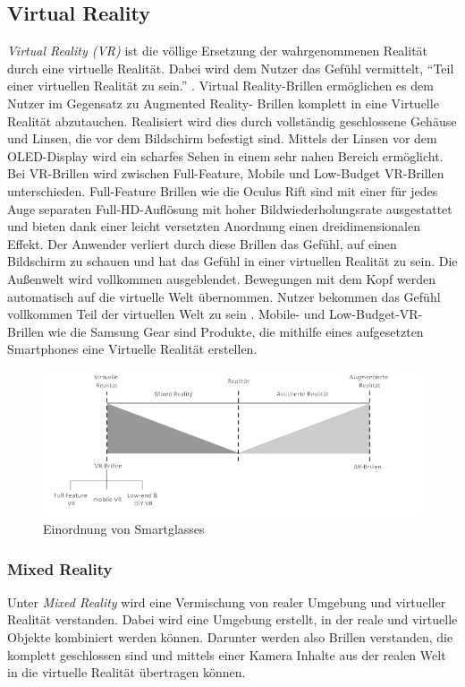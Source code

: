 \subsection{Virtual Reality}
%
\emph{Virtual Reality (VR)} ist die völlige Ersetzung der wahrgenommenen Realität durch eine virtuelle Realität. Dabei wird dem Nutzer das Gefühl vermittelt, \enquote{Teil einer virtuellen Realität zu sein.} \cite[S.~22]{ThomasDirkMetzgerHelmutNiegemannHrsg2018}. Virtual Reality-Brillen ermöglichen es dem Nutzer im Gegensatz zu Augmented Reality- Brillen komplett in eine Virtuelle Realität abzutauchen. Realisiert wird dies durch vollständig geschlossene Gehäuse und Linsen, die vor dem Bildschirm befestigt sind. Mittels der Linsen vor dem OLED-Display wird ein scharfes Sehen in einem sehr nahen Bereich ermöglicht. Bei VR-Brillen wird zwischen Full-Feature, Mobile und Low-Budget VR-Brillen unterschieden. Full-Feature Brillen wie die Oculus Rift sind mit einer für jedes Auge separaten Full-HD-Auflösung mit hoher Bildwiederholungsrate ausgestattet und bieten dank einer leicht versetzten Anordnung einen dreidimensionalen Effekt. Der Anwender verliert durch diese Brillen das Gefühl, auf einen Bildschirm zu schauen und hat das Gefühl in einer virtuellen Realität zu sein. Die Außenwelt wird vollkommen ausgeblendet. Bewegungen mit dem Kopf werden automatisch auf die virtuelle Welt übernommen. Nutzer bekommen das Gefühl vollkommen Teil der virtuellen Welt zu sein \cite[S.~22ff]{ThomasDirkMetzgerHelmutNiegemannHrsg2018}. Mobile- und Low-Budget-VR-Brillen wie die Samsung Gear sind Produkte, die mithilfe eines aufgesetzten Smartphones eine Virtuelle Realität erstellen.
\begin{figure}[htbp]
    \centering
    \includegraphics[width=1\textwidth]{data/bilder/VRvsAR.pdf}
    \caption{Einordnung von Smartglasses}
    \label{fig:Einordnung_Von_Smartglasses}
\end{figure}
%

%
\subsubsection{Mixed Reality}
%
Unter \emph{Mixed Reality} wird eine Vermischung von realer Umgebung und virtueller Realität verstanden. Dabei wird eine Umgebung erstellt, in der reale und virtuelle Objekte kombiniert werden können. Darunter werden also Brillen verstanden, die komplett geschlossen sind und mittels einer Kamera Inhalte aus der realen Welt in die virtuelle Realität übertragen können.
%
